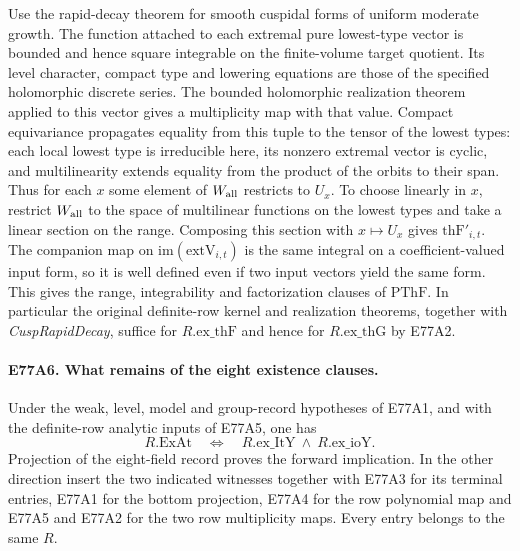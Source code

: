 Use the rapid-decay theorem for smooth cuspidal forms of uniform
moderate growth. The function attached to each extremal pure
lowest-type vector is bounded and hence square integrable on the
finite-volume target quotient. Its level character, compact type
and lowering equations are those of the specified holomorphic
discrete series. The bounded holomorphic realization theorem applied
to this vector gives a multiplicity map with that value. Compact
equivariance propagates equality from this tuple to the tensor of
the lowest types: each local lowest type is irreducible here, its
nonzero extremal vector is cyclic, and multilinearity extends equality
from the product of the orbits to their span. Thus for each $x$ some
element of $W_{\rm all}$ restricts to $U_x$. To choose linearly in $x$,
restrict $W_{\rm all}$ to the space of multilinear functions on the
lowest types and take a linear section on the range. Composing this
section with $x\mapsto U_x$ gives $\mathrm{thF}'_{i,t}$. The companion
map on $\mathrm{im}(\mathrm{extV}_{i,t})$ is the same integral on a
coefficient-valued input form, so it is well defined even if two input
vectors yield the same form. This gives the range, integrability and
factorization clauses of $\mathrm{PThF}$. In particular the original
definite-row kernel and realization theorems, together with
\emph{CuspRapidDecay}, suffice for $R.\mathrm{ex\_thF}$ and hence for
$R.\mathrm{ex\_thG}$ by E77A2.

\paragraph{E77A6. What remains of the eight existence clauses.}
Under the weak, level, model and group-record hypotheses of E77A1,
and with the definite-row analytic inputs of E77A5, one has
\[
 R.\mathrm{ExAt}\quad\Longleftrightarrow\quad
      R.\mathrm{ex\_ItY}\ \land\ R.\mathrm{ex\_ioY}.
\]
Projection of the eight-field record proves the forward implication.
In the other direction insert the two indicated witnesses together
with E77A3 for its terminal entries, E77A1 for the bottom projection,
E77A4 for the row polynomial map and E77A5 and E77A2 for the two row
multiplicity maps. Every entry belongs to the same $R$.

